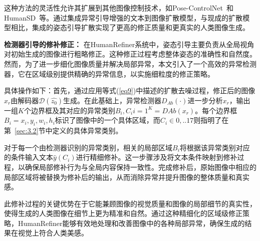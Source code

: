 这种方法的灵活性允许其扩展到其他图像控制技术，如Pose-ControlNet~\cite{controlnet}和HumanSD~\cite{ju2023humansd}等。通过集成异常引导增强的文本到图像扩散模型，与现成的扩散模型相比，集成的姿态引导扩散实现了更高的修正质量和更真实的人类图像生成。





\textbf{检测器引导的修补修正：}
在HumanRefiner系统中，姿态引导主要负责从全局视角对初始生成的图像进行粗略修正。这种修正过程考虑整体姿态的准确性和自然度。然而，为了进一步细化图像质量并解决局部异常，本文引入了一个高效的异常检测器，它在区域级别提供精确的异常信息，以实施细粒度的修正策略。

具体操作如下：首先，通过应用等式(\ref{eq9})中描述的扩散去噪过程，修正后的图像$x_r$由解码器$\mathcal{D}(\hat{z_0})$生成。在此基础上，异常检测器$D_{Ab}(\cdot)$进一步分析$x_r$，输出一组$K$个边界框及其对应的异常类别${B_i, C_i}{i=1}^K = D{Ab}(x_r)$。每个边界框$B_i={x_i, y_i, w_i, h_i}$标识了图像中的一个具体区域，而$C_i \in {0,..17}$则指明了在第~\ref{sec:3.2}节中定义的具体异常类别。

对于每一个由检测器识别的异常类别，相关的局部区域$B_i$将根据该异常类别对应的条件输入文本$\hat{y}(C_i)$进行精细修补。这一步骤涉及将文本条件映射到修补过程，以确保局部修补行为与全局内容保持一致性。完成修补后，原始图像中相应的局部区域将被替换为修补后的输出，从而消除异常并提升图像的整体质量和真实感。

此修补过程的关键优势在于它能兼顾图像的视觉质量和图像的局部细节的真实性，使得生成的人类图像在细节上更为精准和自然。通过这种精细化的区域级修正策略，HumanRefiner能够有效地处理和改善图像中的各种局部异常，确保生成的结果在视觉上符合人类美感。


